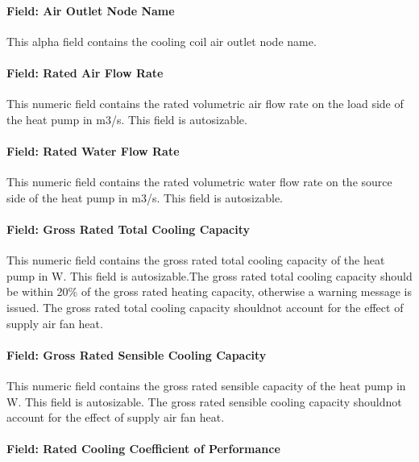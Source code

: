 \paragraph{Field: Air Outlet Node Name}\label{field-air-outlet-node-name-17}

This alpha field contains the cooling coil air outlet node name.

\paragraph{Field: Rated Air Flow Rate}\label{field-rated-air-flow-rate-5}

This numeric field contains the rated volumetric air flow rate on the load side of the heat pump in m3/s. This field is autosizable.

\paragraph{Field: Rated Water Flow Rate}\label{field-rated-water-flow-rate}

This numeric field contains the rated volumetric water flow rate on the source side of the heat pump in m3/s. This field is autosizable.

\paragraph{Field: Gross Rated Total Cooling Capacity}\label{field-gross-rated-total-cooling-capacity-3}

This numeric field contains the gross rated total cooling capacity of the heat pump in W. This field is autosizable.The gross rated total cooling capacity should be within 20\% of the gross rated heating capacity, otherwise a warning message is issued. The gross rated total cooling capacity shouldnot account for the effect of supply air fan heat.

\paragraph{Field: Gross Rated Sensible Cooling Capacity}\label{field-gross-rated-sensible-cooling-capacity}

This numeric field contains the gross rated sensible capacity of the heat pump in W. This field is autosizable. The gross rated sensible cooling capacity shouldnot account for the effect of supply air fan heat.

\paragraph{Field: Rated Cooling Coefficient of Performance}\label{field-rated-cooling-coefficient-of-performance}

